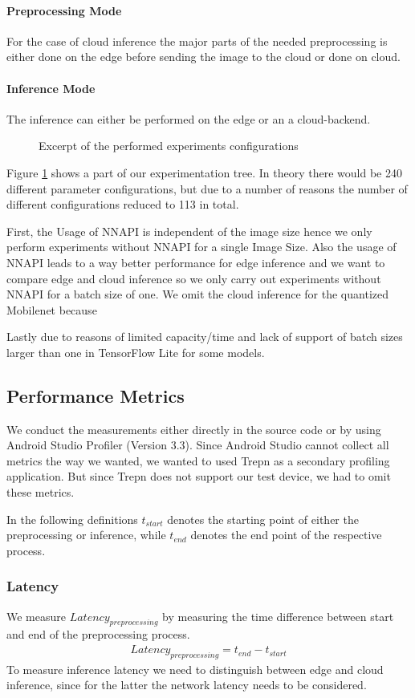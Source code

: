\paragraph{Preprocessing Mode}
For the case of cloud inference the major parts of the needed preprocessing is either done on the edge before sending the image to the cloud or done on cloud.
\paragraph{Inference Mode}
The inference can either be performed on the edge or an a cloud-backend.


\begin{figure}[H]
\centering
 \scalebox{.7}{}

\caption{Excerpt of the performed experiments configurations}
\label{fig:tree}
\end{figure}
Figure \ref{fig:tree} shows a part of our experimentation tree. In theory there would be 240 different parameter configurations, but due to a number of reasons the number of different configurations reduced to 113 in total.

First, the Usage of NNAPI is independent of the image size hence we only perform experiments without NNAPI for a single Image Size. Also the usage of NNAPI leads to a way better performance for edge inference and we want to compare edge and cloud inference so we only carry out experiments without NNAPI for a batch size of one.
We omit the cloud inference for the quantized Mobilenet because %

Lastly due to reasons of limited capacity/time and lack of support of batch sizes larger than one in TensorFlow Lite for some models.
\subsection{Performance Metrics}
\label{chap:insta_measurements}
We conduct the measurements either directly in the source code or by using Android Studio Profiler (Version 3.3). Since Android Studio cannot collect all metrics the way we wanted, we wanted to used Trepn as a secondary profiling application. But since Trepn does not support our test device, we had to omit these metrics.

In the following definitions $t_{start}$ denotes the starting point of either the preprocessing or inference, while $t_{end}$ denotes the end point of the respective process.
\subsubsection{Latency}
We measure $Latency_{preprocessing}$ by measuring the time difference between start and end of the preprocessing process.
\begin{equation*}
\begin{gathered}
Latency_{preprocessing} = t_{end} - t_{start}
\end{gathered}
\end{equation*}
To measure inference latency we need to distinguish between edge and cloud inference, since for the latter the network latency needs to be considered.

